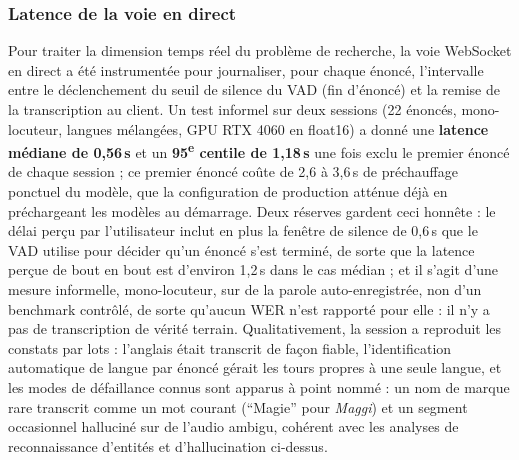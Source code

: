 \documentclass[12pt]{report}
\begin{document}
\subsubsection{Latence de la voie en direct}
Pour traiter la dimension temps réel du problème de recherche, la voie WebSocket en direct a été instrumentée pour journaliser, pour chaque énoncé, l'intervalle entre le déclenchement du seuil de silence du VAD (fin d'énoncé) et la remise de la transcription au client. Un test informel sur deux sessions (22 énoncés, mono-locuteur, langues mélangées, GPU RTX 4060 en float16) a donné une \textbf{latence médiane de 0,56\,s} et un \textbf{95\textsuperscript{e} centile de 1,18\,s} une fois exclu le premier énoncé de chaque session ; ce premier énoncé coûte de 2,6 à 3,6\,s de préchauffage ponctuel du modèle, que la configuration de production atténue déjà en préchargeant les modèles au démarrage. Deux réserves gardent ceci honnête : le délai perçu par l'utilisateur inclut en plus la fenêtre de silence de 0,6\,s que le VAD utilise pour décider qu'un énoncé s'est terminé, de sorte que la latence perçue de bout en bout est d'environ 1,2\,s dans le cas médian ; et il s'agit d'une mesure informelle, mono-locuteur, sur de la parole auto-enregistrée, non d'un benchmark contrôlé, de sorte qu'aucun WER n'est rapporté pour elle : il n'y a pas de transcription de vérité terrain. Qualitativement, la session a reproduit les constats par lots : l'anglais était transcrit de façon fiable, l'identification automatique de langue par énoncé gérait les tours propres à une seule langue, et les modes de défaillance connus sont apparus à point nommé : un nom de marque rare transcrit comme un mot courant (\enquote{Magie} pour \emph{Maggi}) et un segment occasionnel halluciné sur de l'audio ambigu, cohérent avec les analyses de reconnaissance d'entités et d'hallucination ci-dessus.
\end{document}

